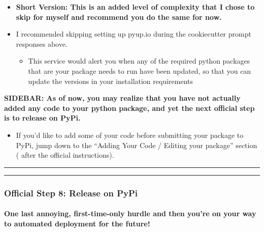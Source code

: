\documentclass[11pt]{article}
\providecommand{\tightlist}{%
      \setlength{\itemsep}{0pt}\setlength{\parskip}{0pt}}
\begin{document}
\begin{itemize}
\tightlist
\item
  \textbf{Short Version: This is an added level of complexity that I
  chose to skip for myself and recommend you do the same for now.}
\item
  I recommended skipping setting up pyup.io during the cookiecutter
  prompt responses above.

  \begin{itemize}
  \tightlist
  \item
    This service would alert you when any of the required python
    packages that are your package needs to run have been updated, so
    that you can update the versions in your installation requirements\\
    \textbf{\emph{ }}
  \end{itemize}
\end{itemize}

\textbf{SIDEBAR: As of now, you may realize that you have not actually
added any code to your python package, and yet the next official step is
to release on PyPi.}

\begin{itemize}
\tightlist
\item
  If you'd like to add some of your code before submitting your package
  to PyPi, jump down to the ``Adding Your Code / Editing your package''
  section ( after the official instructions).
\end{itemize}

\begin{center}\rule{0.5\linewidth}{\linethickness}\end{center}

\begin{center}\rule{0.5\linewidth}{\linethickness}\end{center}

\hypertarget{official-step-8-release-on-pypi}{%
\subsubsection{Official Step 8: Release on
PyPi}\label{official-step-8-release-on-pypi}}

\hypertarget{one-last-annoying-first-time-only-hurdle-and-then-youre-on-your-way-to-automated-deployment-for-the-future}{%
\paragraph{One last annoying, first-time-only hurdle and then you're on
your way to automated deployment for the
future!}\label{one-last-annoying-first-time-only-hurdle-and-then-youre-on-your-way-to-automated-deployment-for-the-future}}
\end{document}
